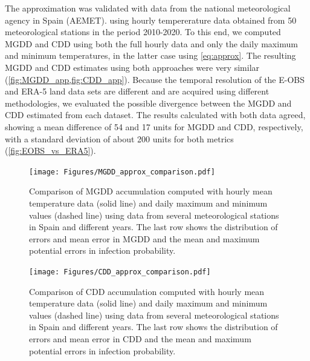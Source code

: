 The approximation was validated with data from the national meteorological
agency in Spain (AEMET). using hourly tempererature data obtained
from 50 meteorological stations in the period 2010-2020. To this end, we
computed MGDD and CDD using both the full hourly data and only the daily
maximum and minimum temperatures, in the latter
case using \cref{eq:approx}. The resulting MGDD and CDD estimates using both
approaches were very similar (\cref{fig:MGDD_app,fig:CDD_app}). Because the
temporal resolution
of the E-OBS and ERA-5 land data sets are different and are acquired using
different methodologies, we evaluated the possible divergence between the MGDD
and CDD estimated from each dataset. The results calculated with
both data agreed, showing a mean difference of 54 and 17 units for MGDD and
CDD, respectively, with a standard deviation of about 200 units for both
metrics
(\cref{fig:EOBS_vs_ERA5}).

\begin{figure}[H]
    \centering
    \texttt{[image: Figures/MGDD\_approx\_comparison.pdf]}
    \caption{Comparison of MGDD accumulation computed with hourly mean
        temperature data (solid line) and daily maximum and minimum values
        (dashed
        line) using data from several meteorological stations in Spain and
        different
        years. The last row shows the distribution of errors and mean error in
        MGDD and
        the mean and maximum potential errors in infection probability.}
    \label{fig:MGDD_app}
\end{figure}

\begin{figure}[H]
    \centering
    \texttt{[image: Figures/CDD\_approx\_comparison.pdf]}
    \caption{Comparison of CDD accumulation computed with hourly mean
        temperature data (solid line) and daily maximum and minimum values
        (dashed
        line) using data from several meteorological stations in Spain and
        different
        years. The last row shows the distribution of errors and mean error in
        CDD and
        the mean and maximum potential errors in infection probability.}
    \label{fig:CDD_app}
\end{figure}

